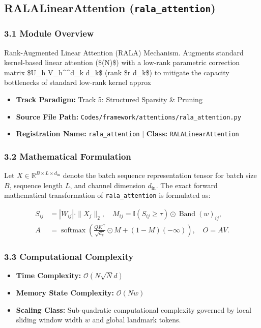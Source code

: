 \subsection{RALALinearAttention (\texttt{rala\_attention})}
\label{sec:app_module_rala_attention}

\subsubsection*{3.1 Module Overview}
Rank-Augmented Linear Attention (RALA) Mechanism.  Augments standard kernel-based linear attention (\$(N)\$) with a low-rank parametric correction matrix \$U\_h V\_h^\top \in {}^{d\_k \times d\_k}\$ (rank \$r \ll d\_k\$) to mitigate the capacity bottlenecks of standard low-rank kernel approx
\begin{itemize}
    \item \textbf{Track Paradigm:} Track 5: Structured Sparsity & Pruning
    \item \textbf{Source File Path:} \texttt{Codes/framework/attentions/rala\_attention.py}
    \item \textbf{Registration Name:} \texttt{rala\_attention} $\mid$ \textbf{Class:} \texttt{RALALinearAttention}
\end{itemize}

\subsubsection*{3.2 Mathematical Formulation}
Let $X \in \mathbb{R}^{B \times L \times d_{\text{in}}}$ denote the batch sequence representation tensor for batch size $B$, sequence length $L$, and channel dimension $d_{\text{in}}$. The exact forward mathematical transformation of \texttt{rala\_attention} is formulated as:

\begin{align}
S_{ij} &= |W_{ij}| \cdot \|X_j\|_2, \quad M_{ij} = \mathbb{I}(S_{ij} \ge \tau) \odot \operatorname{Band}(w)_{ij}, \\
A &= \operatorname{softmax}\left(\frac{Q K^\top}{\sqrt{d_k}} \odot M + (1 - M)(-\infty)\right), \quad O = A V.
\end{align}


\subsubsection*{3.3 Computational Complexity}
\begin{itemize}
    \item \textbf{Time Complexity:} $\mathcal{O}(N \sqrt{N} d)$
    \item \textbf{Memory State Complexity:} $\mathcal{O}(N w)$
    \item \textbf{Scaling Class:} Sub-quadratic computational complexity governed by local sliding window width $w$ and global landmark tokens.
\end{itemize}

